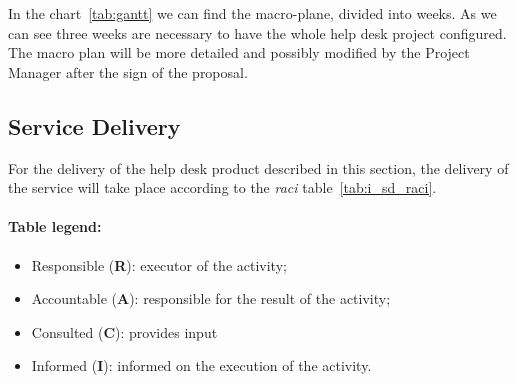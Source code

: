 In the chart~\ref{tab:gantt} we can find the macro-plane, divided into weeks. As we can see three weeks are necessary to have the whole help desk project configured. The macro plan will be more detailed and possibly modified by the Project Manager after the sign of the proposal.

\subsection{Service Delivery}
For the delivery of the help desk product described in this section, the delivery of the
service will take place according to the \textit{\gls{raci}} table~\ref{tab:i_sd_raci}.

\paragraph{Table legend:}
\begin{itemize}
	\item Responsible (\textbf{R}): executor of the activity;
	\item Accountable (\textbf{A}): responsible for the result of the activity;
	\item Consulted (\textbf{C}): provides input
	\item Informed (\textbf{I}): informed on the execution of the activity.
\end{itemize}

